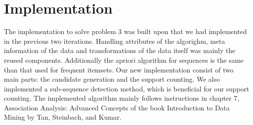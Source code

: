 \section{Implementation}
The implementation to solve problem 3 was built upon that we had implemented in the previous two iterations. 
Handling attributes of the algorighm, meta information of the data and transformations of the data itself 
was mainly the reused components. Additionally the apriori algorithm for sequences is
the same than that used for frequent itemsets. Our new implementation consist of two 
main parts: the candidate generation and the support counting. We also implemented a 
sub-sequence detection method, which is beneficial for our support counting. 
The implemented algorithm mainly follows instructions in chapter 7, Association Analysis: Advanced Concepts of the book Introduction to Data Mining by Tan, 
Steinbach, and Kumar. 

